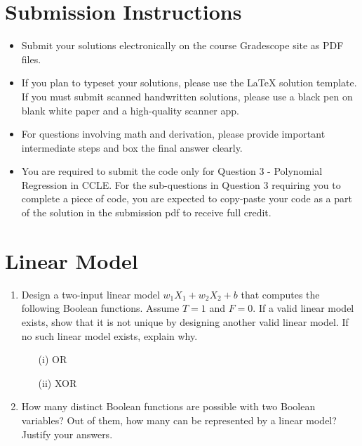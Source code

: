 \documentclass[11pt]{article}
\begin{document}
\author{}
\date{}
\maketitle
\vspace{-0.75in}

\vspace{-11pt}


\ifsoln
\else
\section*{Submission Instructions}
\begin{itemize}
\item 
Submit your solutions electronically on the course Gradescope site as PDF files.
\item If you plan to typeset your solutions, please use the LaTeX solution template. If you must submit scanned handwritten solutions, please use a black pen on blank white paper and a high-quality scanner app.
\item For questions involving math and derivation, please provide important intermediate steps and box the final answer clearly.
\item You are required to submit the code only for Question 3 - Polynomial Regression in CCLE. For the sub-questions in Question 3 requiring you to complete a piece of code, you are expected to copy-paste your code as a part of the solution in the submission pdf to receive full credit.
\end{itemize}
\fi

\ifnotsolution{\newpage}
\section{Linear Model }
\begin{enumerate}
\item Design a two-input linear model $w_1 X_1 + w_2X_2 + b$ that computes the following Boolean functions. Assume $T=1$ and $F=0$. If a valid linear model exists, show that it is not unique by designing another valid linear model. If no such linear model exists, explain why.
\begin{itemize}
	\item [(i)] OR 
	\item [(ii)] XOR 
\end{itemize}

\solution{
}

\item How many distinct Boolean functions are possible with two Boolean variables? Out of them, how many can be represented by a linear model? Justify your answers. 

\solution{}
\end{enumerate}
\end{document}
